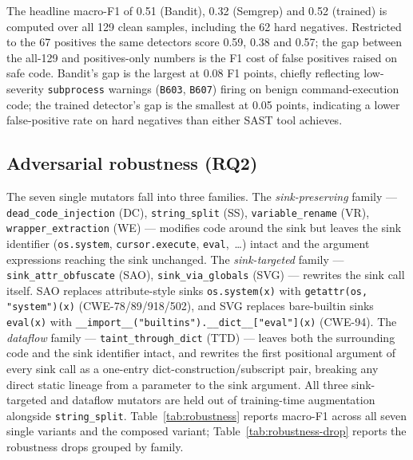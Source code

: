The headline macro-F1 of 0.51 (Bandit), 0.32 (Semgrep) and 0.52
(trained) is computed over all 129 clean samples, including the 62
hard negatives. Restricted to the 67 positives the same detectors
score 0.59, 0.38 and 0.57; the gap between the all-129 and
positives-only numbers is the F1 cost of false positives raised on
safe code. Bandit's gap is the largest at 0.08 F1 points, chiefly
reflecting low-severity \texttt{subprocess} warnings (\texttt{B603},
\texttt{B607}) firing on benign command-execution code; the trained
detector's gap is the smallest at 0.05 points, indicating a lower
false-positive rate on hard negatives than either SAST tool achieves.

\subsection{Adversarial robustness (RQ2)}
\label{sec:eval:robustness}

The seven single mutators fall into three families. The
\emph{sink-preserving} family — \texttt{dead\_code\_injection} (DC),
\texttt{string\_split} (SS), \texttt{variable\_rename} (VR),
\texttt{wrapper\_extraction} (WE) — modifies code around the sink but
leaves the sink identifier (\texttt{os.system},
\texttt{cursor.execute}, \texttt{eval},~\ldots) intact and the
argument expressions reaching the sink unchanged. The
\emph{sink-targeted} family — \texttt{sink\_attr\_obfuscate} (SAO),
\texttt{sink\_via\_globals} (SVG) — rewrites the sink call itself.
SAO replaces attribute-style sinks \texttt{os.system(x)} with
\texttt{getattr(os, "system")(x)} (CWE-78/89/918/502), and SVG
replaces bare-builtin sinks \texttt{eval(x)} with
\texttt{\_\_import\_\_("builtins").\_\_dict\_\_["eval"](x)}
(CWE-94). The \emph{dataflow} family —
\texttt{taint\_through\_dict} (TTD) — leaves both the surrounding
code and the sink identifier intact, and rewrites the first
positional argument of every sink call as a one-entry
dict-construction/subscript pair, breaking any direct static
lineage from a parameter to the sink argument. All three
sink-targeted and dataflow mutators are held out of training-time
augmentation alongside \texttt{string\_split}.
Table~\ref{tab:robustness} reports macro-F1 across all seven single
variants and the composed variant; Table~\ref{tab:robustness-drop}
reports the robustness drops grouped by family.

